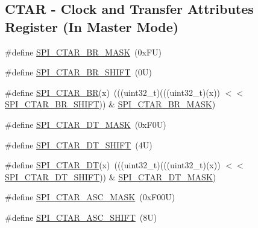 \subsection*{C\+T\+AR -\/ Clock and Transfer Attributes Register (In Master Mode)}
\begin{DoxyCompactItemize}
\item 
\#define \mbox{\hyperlink{group___s_p_i___register___masks_gad1ba5817c825831950fc73cc726f0737}{S\+P\+I\+\_\+\+C\+T\+A\+R\+\_\+\+B\+R\+\_\+\+M\+A\+SK}}~(0x\+F\+U)
\item 
\#define \mbox{\hyperlink{group___s_p_i___register___masks_gad988143e0be530acb59dca0fad52ec0b}{S\+P\+I\+\_\+\+C\+T\+A\+R\+\_\+\+B\+R\+\_\+\+S\+H\+I\+FT}}~(0\+U)
\item 
\#define \mbox{\hyperlink{group___s_p_i___register___masks_ga8ef1d047cb27c76c57b494ffeada5259}{S\+P\+I\+\_\+\+C\+T\+A\+R\+\_\+\+BR}}(x)~(((uint32\+\_\+t)(((uint32\+\_\+t)(x)) $<$$<$ \mbox{\hyperlink{group___s_p_i___register___masks_gad988143e0be530acb59dca0fad52ec0b}{S\+P\+I\+\_\+\+C\+T\+A\+R\+\_\+\+B\+R\+\_\+\+S\+H\+I\+FT}})) \& \mbox{\hyperlink{group___s_p_i___register___masks_gad1ba5817c825831950fc73cc726f0737}{S\+P\+I\+\_\+\+C\+T\+A\+R\+\_\+\+B\+R\+\_\+\+M\+A\+SK}})
\item 
\#define \mbox{\hyperlink{group___s_p_i___register___masks_ga7d4ee19c78f67b68c6320eefe6a53ac0}{S\+P\+I\+\_\+\+C\+T\+A\+R\+\_\+\+D\+T\+\_\+\+M\+A\+SK}}~(0x\+F0\+U)
\item 
\#define \mbox{\hyperlink{group___s_p_i___register___masks_gaac557ee81ac4ec00ee6280d5b761edf1}{S\+P\+I\+\_\+\+C\+T\+A\+R\+\_\+\+D\+T\+\_\+\+S\+H\+I\+FT}}~(4\+U)
\item 
\#define \mbox{\hyperlink{group___s_p_i___register___masks_ga48f6e8c7555056687cfcc2c56fc63c46}{S\+P\+I\+\_\+\+C\+T\+A\+R\+\_\+\+DT}}(x)~(((uint32\+\_\+t)(((uint32\+\_\+t)(x)) $<$$<$ \mbox{\hyperlink{group___s_p_i___register___masks_gaac557ee81ac4ec00ee6280d5b761edf1}{S\+P\+I\+\_\+\+C\+T\+A\+R\+\_\+\+D\+T\+\_\+\+S\+H\+I\+FT}})) \& \mbox{\hyperlink{group___s_p_i___register___masks_ga7d4ee19c78f67b68c6320eefe6a53ac0}{S\+P\+I\+\_\+\+C\+T\+A\+R\+\_\+\+D\+T\+\_\+\+M\+A\+SK}})
\item 
\#define \mbox{\hyperlink{group___s_p_i___register___masks_gad15c92f5474cc1ba1ca2af14c92cbf26}{S\+P\+I\+\_\+\+C\+T\+A\+R\+\_\+\+A\+S\+C\+\_\+\+M\+A\+SK}}~(0x\+F00\+U)
\item 
\#define \mbox{\hyperlink{group___s_p_i___register___masks_gadbf91ef3bf1d4943ab782ff027d121bd}{S\+P\+I\+\_\+\+C\+T\+A\+R\+\_\+\+A\+S\+C\+\_\+\+S\+H\+I\+FT}}~(8\+U)

\end{DoxyCompactItemize}
